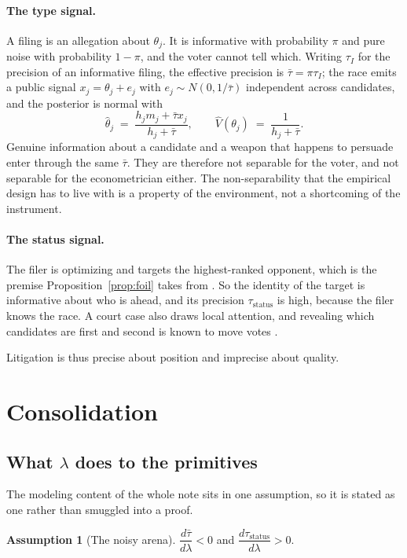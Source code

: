 \documentclass[11pt]{article}
\theoremstyle{definition}
\newtheorem{assumption}{Assumption}
\theoremstyle{remark}
\begin{document}
\paragraph{The type signal.}
A filing is an allegation about $\theta_j$. It is informative with probability
$\pi$ and pure noise with probability $1 - \pi$, and the voter cannot tell
which. Writing $\tau_I$ for the precision of an informative filing, the
effective precision is $\bar\tau = \pi\tau_I$; the race emits a public signal
$x_j = \theta_j + e_j$ with $e_j \sim N(0, 1/\bar\tau)$ independent across
candidates, and the posterior is normal with
\[
  \hat\theta_j \;=\; \frac{h_j m_j + \bar\tau x_j}{h_j + \bar\tau},
  \qquad
  \hat V(\theta_j) \;=\; \frac{1}{h_j + \bar\tau}.
\]
Genuine information about a candidate and a weapon that happens to persuade
enter through the same $\bar\tau$. They are therefore not separable for the
voter, and not separable for the econometrician either. The
non-separability that the empirical design has to live with is a property of
the environment, not a shortcoming of the instrument.

\paragraph{The status signal.}
The filer is optimizing and targets the highest-ranked opponent, which is the
premise Proposition~\ref{prop:foil} takes from \citet{nakaguma2025}. So the
identity of the target is informative about who is ahead, and its precision
$\tau_{\mathrm{status}}$ is high, because the filer knows the race. A court
case also draws local attention, and revealing which candidates are first and
second is known to move votes \citep{anagol2016}.

Litigation is thus precise about position and imprecise about quality.

\section{Consolidation}
\label{sec:consolidation}

\subsection{What \texorpdfstring{$\lambda$}{lambda} does to the primitives}

The modeling content of the whole note sits in one assumption, so it is stated
as one rather than smuggled into a proof.

\begin{assumption}[The noisy arena]
\label{as:arena}
$\dfrac{d\bar\tau}{d\lambda} < 0$ and
$\dfrac{d\tau_{\mathrm{status}}}{d\lambda} > 0$.
\end{assumption}
\end{document}
